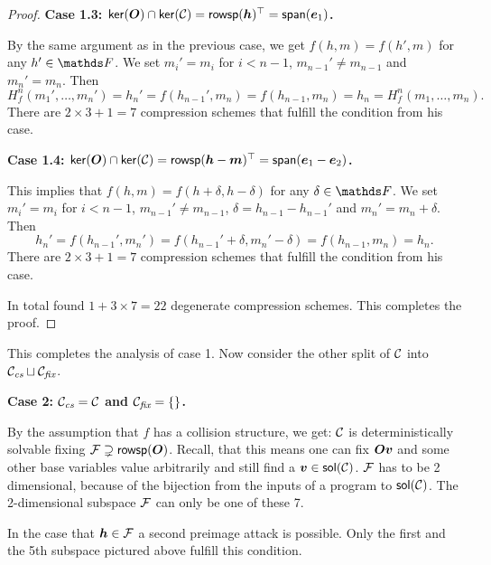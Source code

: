\begin{proof}
\textbf{Case 1.3: $\mathsf{ker}(\boldsymbol{O}) \cap \mathsf{ker}(\mathcal{C}) = \mathsf{rowsp}(\boldsymbol h)^\top = \mathsf{span}(\boldsymbol e_1)$.}

By the same argument as in the previous case, we get $f(h,m) = f(h',m)$ for any $h' \in \F$.
We set $m_i' = m_i$ for $i<n-1$, $m_{n-1}' \neq m_{n-1}$ and $m_n' = m_n$. 
Then
\[
H^n_f(m_1', \dots, m_n') = h_n' = f(h_{n-1}', m_n) = f(h_{n-1}, m_n) = h_n = H^n_f(m_1, \dots, m_n).
\]
There are $2 \times 3 + 1 = 7$ compression schemes that fulfill the condition from his case.
\begin{center}
\end{center}

\textbf{Case 1.4: $\mathsf{ker}(\boldsymbol{O}) \cap \mathsf{ker}(\mathcal{C}) = \mathsf{rowsp}(\boldsymbol h - \boldsymbol m)^\top = \mathsf{span}(\boldsymbol e_1 - \boldsymbol e_2)$.}

This implies that $f(h,m) = f(h + \delta, h - \delta)$ for any $\delta \in \F$.
We set $m_i' = m_i$ for $i<n-1$, $m_{n-1}' \neq m_{n-1}$, $\delta = h_{n-1} - h_{n-1}'$ and $m_n' = m_n + \delta$.
Then
\[
h_n' = f(h_{n-1}', m_n') = f(h_{n-1}' + \delta, m_n' - \delta) = f(h_{n-1}, m_n) = h_n.
\]
There are $2 \times 3 + 1 = 7$ compression schemes that fulfill the condition from his case.
\begin{center}
\end{center}

In total found $1 + 3\times7 = 22$ degenerate compression schemes.
This completes the proof.
\end{proof}

This completes the analysis of case 1.
Now consider the other split of $\mathcal{C}$ into $\mathcal{C}_\textit{cs} \sqcup \mathcal{C}_\textit{fix}$.

\textbf{Case 2: $\mathcal{C}_\textit{cs} = \mathcal{C}$ and $\mathcal{C}_\textit{fix} = \{\}$.}

By the assumption that $f$ has a collision structure, we get:
$\mathcal{C}$ is deterministically solvable fixing $\mathcal{F} \supsetneq \mathsf{rowsp}(\boldsymbol{O})$.
Recall, that this means one can fix $\boldsymbol{O}\boldsymbol v$ and some other base variables value arbitrarily and still find a $\boldsymbol v \in \mathsf{sol}(\mathcal{C})$.
$\mathcal{F}$ has to be 2 dimensional, because of the bijection from the inputs of a program to $\mathsf{sol}(\mathcal{C})$.
The 2-dimensional subspace $\mathcal{F}$ can only be one of these 7.
\begin{center}
\end{center}
In the case that $\boldsymbol h \in \mathcal{F}$ a second preimage attack is possible.
Only the first and the 5th subspace pictured above fulfill this condition.

